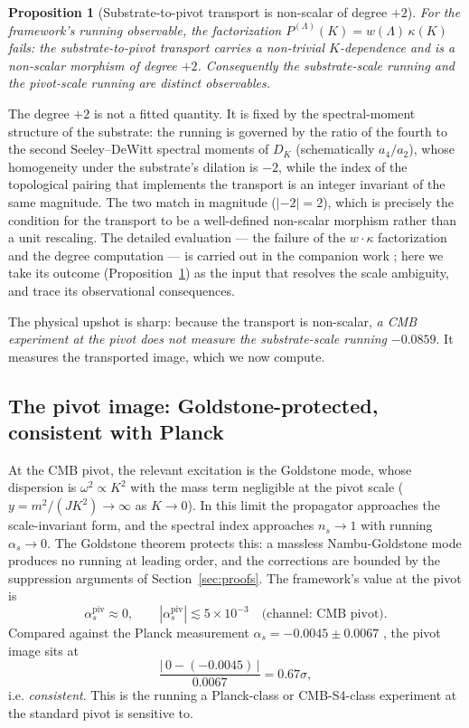 \documentclass[12pt]{article}
\newtheorem{proposition}[theorem]{Proposition}
\theoremstyle{definition}
\theoremstyle{remark}
\begin{document}
\begin{proposition}[Substrate-to-pivot transport is non-scalar of degree $+2$]\label{prop:transport}
For the framework's running observable, the factorization $P^{(\Lambda)}(K) = w(\Lambda)\,\kappa(K)$ \emph{fails}: the substrate-to-pivot transport carries a non-trivial $K$-dependence and is a non-scalar morphism of degree $+2$. Consequently the substrate-scale running and the pivot-scale running are distinct observables.
\end{proposition}

The degree $+2$ is not a fitted quantity. It is fixed by the spectral-moment structure of the substrate: the running is governed by the ratio of the fourth to the second Seeley--DeWitt spectral moments of $D_K$ (schematically $a_4/a_2$), whose homogeneity under the substrate's dilation is $-2$, while the index of the topological pairing that implements the transport is an integer invariant of the same magnitude. The two match in magnitude ($|{-2}| = 2$), which is precisely the condition for the transport to be a well-defined non-scalar morphism rather than a unit rescaling. The detailed evaluation --- the failure of the $w\cdot\kappa$ factorization and the degree computation --- is carried out in the companion work \citep{PhononExflation}; here we take its outcome (Proposition~\ref{prop:transport}) as the input that resolves the scale ambiguity, and trace its observational consequences.

The physical upshot is sharp: because the transport is non-scalar, \emph{a CMB experiment at the pivot does not measure the substrate-scale running} $-0.0859$. It measures the transported image, which we now compute.

\subsection{The pivot image: Goldstone-protected, consistent with Planck}\label{sec:pivot-image}

At the CMB pivot, the relevant excitation is the Goldstone mode, whose dispersion is $\omega^2 \propto K^2$ with the mass term negligible at the pivot scale ($y = m^2/(JK^2) \to \infty$ as $K \to 0$). In this limit the propagator approaches the scale-invariant form, and the spectral index approaches $n_s \to 1$ with running $\alpha_s \to 0$. The Goldstone theorem protects this: a massless Nambu-Goldstone mode produces no running at leading order, and the corrections are bounded by the suppression arguments of Section~\ref{sec:proofs}. The framework's value at the pivot is
\begin{equation}\label{eq:alpha-pivot}
  \alpha_s^{\mathrm{piv}} \approx 0, \qquad |\alpha_s^{\mathrm{piv}}| \lesssim 5 \times 10^{-3}\quad\text{(channel: CMB pivot)}.
\end{equation}
Compared against the Planck measurement $\alpha_s = -0.0045 \pm 0.0067$ \citep{Planck2018VI}, the pivot image sits at
\begin{equation}
  \frac{|\,0 - (-0.0045)\,|}{0.0067} = 0.67\sigma,
\end{equation}
i.e. \emph{consistent}. This is the running a Planck-class or CMB-S4-class experiment at the standard pivot is sensitive to.
\end{document}
